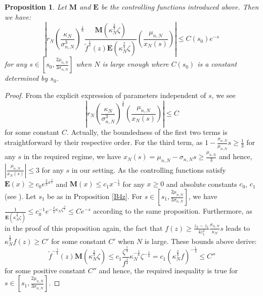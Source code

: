 \documentclass[11pt]{article}
\newtheorem{proposition}[theorem]{Proposition}
\numberwithin{equation}{section}%
\numberwithin{theorem}{section}
\begin{document}
\begin{proposition}\label{ex1}
    Let $\textbf{M}$ and $\textbf{E}$ be the controlling functions introduced above. Then we have:
    \begin{equation*}
        \left|r_N\left(\frac{\kappa_N}{\sigma_{n,N}^3}\right)^{\frac{1}{6}}\frac{\mathbf{M}\left(\kappa_N^\frac{2}{3}\zeta\right)}{\tilde{f}^\frac{1}{4}(z)\mathbf{E}\left(\kappa_N^\frac{2}{3}\zeta\right)}\left(\frac{\mu_{n,N}}{x_N(s)}\right)\right|\le C(s_0)e^{-s}
    \end{equation*}
    for any $s\in\left[s_0,\frac{2\mu_{n,N}}{3\sigma_{n,N}}\right]$ when $N$ is large enough where $C(s_0)$ is a constant determined by $s_0$.
\end{proposition}
\begin{proof}
 From the explicit expression of parameters independent of $s$, we see
\begin{equation*}
     \left|r_N\left(\frac{\kappa_N}{\sigma_{n,N}^3}\right)^{\frac{1}{6}}\left(\frac{\mu_{n,N}}{x_N(s)}\right)\right|\le C
\end{equation*}
for some constant $C$. Actually, the boundedness of the first two terms is straightforward by their respective order. For the third term, as $1-\frac{\sigma_{n,N}}{\mu_{n,N}}s\ge\frac{1}{3}$ for any $s$ in the required regime, we have $x_N(s)=\mu_{n,N}-\sigma_{n,N}s\ge\frac{\mu_{n,N}}{3}$ and hence, $\left|\frac{\mu_{n,N}}{x_N(s)}\right|\le3$ for any $s$ in our setting.
As the controlling functions satisfy $\mathbf{E}(x)\ge c_0e^{\frac{2}{3}x^\frac{3}{2}}$ and $\mathbf{M}(x)\le c_1x^{-\frac{1}{4}}$ for any $x\ge 0$ and absolute constants $c_0$, $c_1$ (see \cite[Chapter $11$]{olver1997asymptotics}). Let $s_1$ be as in Proposition \ref{B4z}. For $s\in\left[s_1,\frac{2\mu_{n,N}}{3\sigma_{n,N}}\right]$, we have $\frac{1}{\mathbf{E}\left(\kappa_N^\frac{2}{3}\zeta\right)}\le c_0^{-1}e^{-\frac{2}{3}\kappa_N\zeta^{\frac{3}{2}}}\le Ce^{-s}$ according to the same proposition. Furthermore, as in the proof of this proposition again, the fact that $f(z)\ge\frac{z_2-z_1}{4z_1^2}\frac{\sigma_{n,N}}{\kappa_N}s$ leads to $\kappa_N^{\frac{2}{3}}f(z)\ge C'$ for some constant $C'$ when $N$ is large. These bounds above derive:
\begin{equation*}
    \tilde{f}^{-\frac{1}{4}}(z)\mathbf{M}(\kappa_N^{\frac{2}{3}}\zeta)\le c_1\frac{\zeta^\frac{1}{4}}{f^\frac{1}{4}}\kappa_N^{-\frac{1}{6}}\zeta^{-\frac{1}{4}}=c_1\left(\kappa_N^\frac{2}{3}f\right)^{-\frac{1}{4}}\le C''
\end{equation*}
for some positive constant $C''$ and hence, the required inequality is true for $s\in\left[s_1,\frac{2\mu_{n,N}}{3\sigma_{n,N}}\right]$.


\end{proof}
\end{document}
